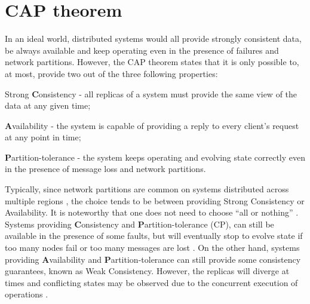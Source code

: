 



\section{CAP theorem}
\label{sec:cap}


In an ideal world, distributed systems would all provide strongly consistent data, be always available and keep operating even in the presence of failures and network partitions.
However, the CAP theorem \cite{cap} states that it is only possible to, at most, provide two out of the three following properties:
\begin{enumerate*}[label=(\roman*)]
	\item Strong \textbf{C}onsistency - all replicas of a system must provide the same view of the data at any given time;
	\item \textbf{A}vailability - the system is capable of providing a reply to every client's request at any point in time;
	\item \textbf{P}artition-tolerance - the system keeps operating and evolving state correctly even in the presence of message loss and network partitions.
\end{enumerate*}

Typically, since network partitions are common on systems distributed across multiple regions \cite{understandingEC}, the choice tends to be between providing Strong Consistency or Availability.
It is noteworthy that one does not need to choose ``all or nothing'' \cite{understandingEC}. 
Systems providing \textbf{C}onsistency and \textbf{P}artition-tolerance (CP), can still be available in the presence of some faults, but will eventually stop to evolve state if too many nodes fail or too many messages are lost \cite{cap}.
On the other hand, systems providing \textbf{A}vailability and \textbf{P}artition-tolerance can still provide some consistency guarantees, known as Weak Consistency. However, the replicas will diverge at times and conflicting states may be observed due to the concurrent execution of operations \cite{understandingEC}.

